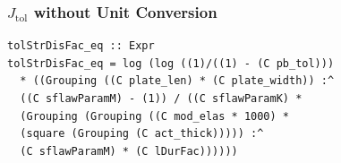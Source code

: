 \documentclass[t,12pt,numbers,fleqn]{beamer}
\begin{document}

\begin{frame}

\frametitle{$J_{\mbox{tol}}$ without Unit Conversion}

\begin{lstlisting}
tolStrDisFac_eq :: Expr
tolStrDisFac_eq = log (log ((1)/((1) - (C pb_tol)))
  * ((Grouping ((C plate_len) * (C plate_width)) :^
  ((C sflawParamM) - (1)) / ((C sflawParamK) *
  (Grouping (Grouping ((C mod_elas * 1000) *
  (square (Grouping (C act_thick))))) :^ 
  (C sflawParamM) * (C lDurFac))))))
\end{lstlisting}
\end{frame}










\end{document}
